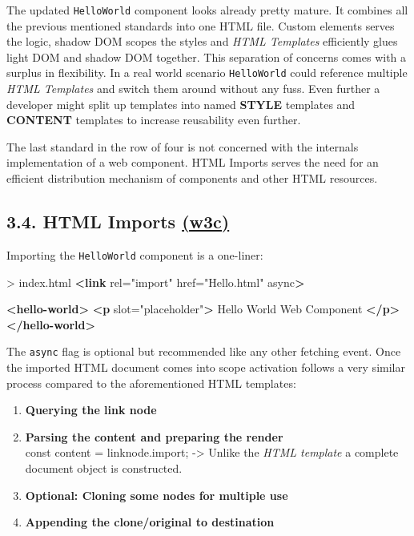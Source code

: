 \documentclass[]{article}
\newenvironment{Shaded}{}{}
\newcommand{\KeywordTok}[1]{\textcolor[rgb]{0.00,0.44,0.13}{\textbf{{#1}}}}
\newcommand{\StringTok}[1]{\textcolor[rgb]{0.25,0.44,0.63}{{#1}}}
\newcommand{\OtherTok}[1]{\textcolor[rgb]{0.00,0.44,0.13}{{#1}}}
\newcommand{\NormalTok}[1]{{#1}}
\begin{document}
The updated \texttt{HelloWorld} component looks already pretty mature.
It combines all the previous mentioned standards into one HTML file.
Custom elements serves the logic, shadow DOM scopes the styles and
\emph{HTML Templates} efficiently glues light DOM and shadow DOM
together. This separation of concerns comes with a surplus in
flexibility. In a real world scenario \texttt{HelloWorld} could
reference multiple \emph{HTML Templates} and switch them around without
any fuss. Even further a developer might split up templates into named
\textbf{STYLE} templates and \textbf{CONTENT} templates to increase
reusability even further.

The last standard in the row of four is not concerned with the internals
implementation of a web component. HTML Imports serves the need for an
efficient distribution mechanism of components and other HTML resources.

\subsection{\texorpdfstring{3.4. HTML Imports
\href{https://www.w3.org/TR/html-imports/}{(w3c)}}{3.4. HTML Imports (w3c)}}\label{html-imports-w3c}

Importing the \texttt{HelloWorld} component is a one-liner:

\begin{Shaded}
\begin{Highlighting}[]
\NormalTok{> index.html}
\KeywordTok{<link}\OtherTok{ rel=}\StringTok{"import"}\OtherTok{ href=}\StringTok{"Hello.html"}\OtherTok{ async}\KeywordTok{>}

\KeywordTok{<hello-world>}
  \KeywordTok{<p}\OtherTok{ slot=}\StringTok{"placeholder"}\KeywordTok{>}
    \NormalTok{Hello World Web Component}
  \KeywordTok{</p>}
\KeywordTok{</hello-world>}
\end{Highlighting}
\end{Shaded}

The \texttt{async} flag is optional but recommended like any other
fetching event. Once the imported HTML document comes into scope
activation follows a very similar process compared to the aforementioned
HTML templates:

\begin{enumerate}
\def\labelenumi{\arabic{enumi}.}
\item
  \textbf{Querying the link node}
\item
  \textbf{Parsing the content and preparing the render}\\
  const content = linknode.import; -\textgreater{} Unlike the \emph{HTML
  template} a complete document object is constructed.
\item
  \textbf{Optional: Cloning some nodes for multiple use}
\item
  \textbf{Appending the clone/original to destination}
\end{enumerate}
\end{document}
